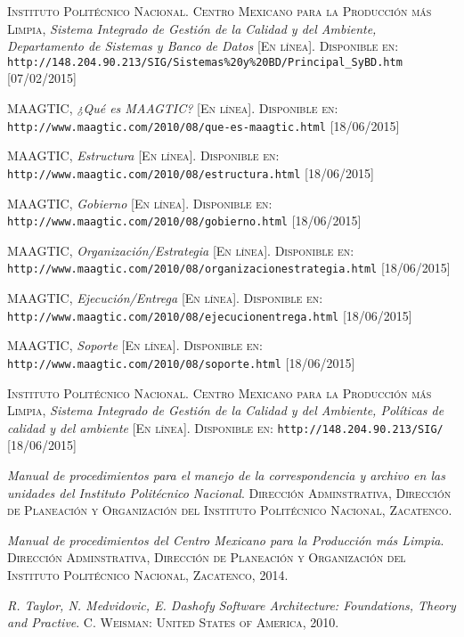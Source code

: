 \begin{thebibliography}{X}
		\textsc{Instituto Politécnico Nacional. Centro Mexicano para la Producción más Limpia},
		\textit{Sistema Integrado de Gestión de la Calidad y del Ambiente, Departamento de Sistemas y Banco de Datos}
		\textsc{[En línea]. Disponible en:}
		\texttt{http://148.204.90.213/SIG/Sistemas\%20y\%20BD/Principal\_SyBD.htm}
		\textsc{[07/02/2015]}
		
		\textsc{MAAGTIC},
		\textit{¿Qué es MAAGTIC?}
		\textsc{[En línea]. Disponible en:}
		\texttt{http://www.maagtic.com/2010/08/que-es-maagtic.html}
		\textsc{[18/06/2015]}
		
		\textsc{MAAGTIC},
		\textit{Estructura}
		\textsc{[En línea]. Disponible en:}
		\texttt{http://www.maagtic.com/2010/08/estructura.html}
		\textsc{[18/06/2015]}
		
		\textsc{MAAGTIC},
		\textit{Gobierno}
		\textsc{[En línea]. Disponible en:}
		\texttt{http://www.maagtic.com/2010/08/gobierno.html}
		\textsc{[18/06/2015]}

		\textsc{MAAGTIC},
		\textit{Organización/Estrategia}
		\textsc{[En línea]. Disponible en:}
		\texttt{http://www.maagtic.com/2010/08/organizacionestrategia.html}
		\textsc{[18/06/2015]}

		\textsc{MAAGTIC},
		\textit{Ejecución/Entrega}
		\textsc{[En línea]. Disponible en:}
		\texttt{http://www.maagtic.com/2010/08/ejecucionentrega.html}
		\textsc{[18/06/2015]}
		
		\textsc{MAAGTIC},
		\textit{Soporte}
		\textsc{[En línea]. Disponible en:}
		\texttt{http://www.maagtic.com/2010/08/soporte.html}
		\textsc{[18/06/2015]}
		
		\textsc{Instituto Politécnico Nacional. Centro Mexicano para la Producción más Limpia},
		\textit{Sistema Integrado de Gestión de la Calidad y del Ambiente, Políticas de calidad y del ambiente}
		\textsc{[En línea]. Disponible en:}
		\texttt{http://148.204.90.213/SIG/}
		\textsc{[18/06/2015]}
		
		\textit{Manual de procedimientos para el manejo de la correspondencia y archivo en las unidades del Instituto Politécnico Nacional}. 
		\textsc{Dirección Adminstrativa, Dirección de Planeación y Organización del Instituto Politécnico Nacional, Zacatenco.}
		
		\textit{Manual de procedimientos del Centro Mexicano para la Producción más Limpia}. 
		\textsc{Dirección Adminstrativa, Dirección de Planeación y Organización del Instituto Politécnico Nacional, Zacatenco, 2014.}
		
		\textit{R. Taylor, N. Medvidovic, E. Dashofy}
		\textit{Software Architecture: Foundations, Theory and Practive}. 
		\textsc{C. Weisman: United States of America, 2010.}
		
\end{thebibliography}
